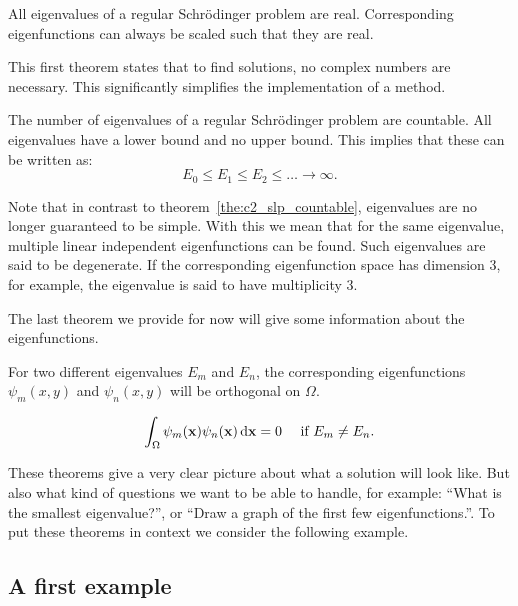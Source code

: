 \begin{theorem}\label{the:c3_real_eigenvalues}
  All eigenvalues of a regular Schrödinger problem are real. Corresponding eigenfunctions can always be scaled such that they are real.
\end{theorem}

This first theorem states that to find solutions, no complex numbers are necessary. This significantly simplifies the implementation of a method.

\begin{theorem}\label{the:c3_eigs_countable}
  The number of eigenvalues of a regular Schrödinger problem are countable. All eigenvalues have a lower bound and no upper bound. This implies that these can be written as:
  $$
    E_0 \leq E_1 \leq E_2 \leq \dots \to \infty \text{.}
  $$
\end{theorem}

Note that in contrast to theorem~\ref{the:c2_slp_countable}, eigenvalues are no longer guaranteed to be simple. With this we mean that for the same eigenvalue, multiple linear independent eigenfunctions can be found. Such eigenvalues are said to be degenerate. If the corresponding eigenfunction space has dimension $3$, for example, the eigenvalue is said to have multiplicity $3$.

The last theorem we provide for now will give some information about the eigenfunctions.

\begin{theorem}\label{the:c3_eigs_othogonal}
  For two different eigenvalues $E_m$ and $E_n$, the corresponding eigenfunctions $\psi_m(x, y)$ and $\psi_n(x, y)$ will be orthogonal on $\Omega$.

  $$
    \int_\Omega \psi_m(\vb{x}) \psi_n(\vb{x}) \, \dd \vb{x} = 0 \quad \text{ if $E_m \neq E_n$.}
  $$
\end{theorem}

These theorems give a very clear picture about what a solution will look like. But also what kind of questions we want to be able to handle, for example: ``What is the smallest eigenvalue?'', or ``Draw a graph of the first few eigenfunctions.''. To put these theorems in context we consider the following example.

\subsection{A first example}\label{sec:c3_first_example}

